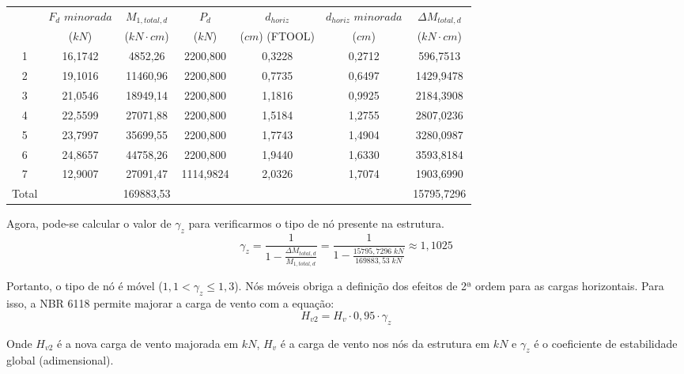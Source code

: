 \begin{table}[H]
\centering
\begin{tabular}{c|c|c|ccc|c}
\hline
 & $F_d$ $minorada$ & $M_{1, total, d}$ & \multicolumn{1}{c|}{$P_d$} & \multicolumn{1}{c|}{$d_{horiz}$} & $d_{horiz}$ $minorada$ & $\Delta M_{total, d}$ \\
 & ($kN$) & ($kN\cdot cm$) & \multicolumn{1}{c|}{($kN$)} & \multicolumn{1}{c|}{($cm$) (FTOOL)} & ($cm$) & ($kN\cdot cm$) \\ \hline
1 & 16,1742 & 4852,26 & \multicolumn{1}{c|}{2200,800} & \multicolumn{1}{c|}{0,3228} & 0,2712 & 596,7513 \\
2 & 19,1016 & 11460,96 & \multicolumn{1}{c|}{2200,800} & \multicolumn{1}{c|}{0,7735} & 0,6497 & 1429,9478 \\
3 & 21,0546 & 18949,14 & \multicolumn{1}{c|}{2200,800} & \multicolumn{1}{c|}{1,1816} & 0,9925 & 2184,3908 \\
4 & 22,5599 & 27071,88 & \multicolumn{1}{c|}{2200,800} & \multicolumn{1}{c|}{1,5184} & 1,2755 & 2807,0236 \\
5 & 23,7997 & 35699,55 & \multicolumn{1}{c|}{2200,800} & \multicolumn{1}{c|}{1,7743} & 1,4904 & 3280,0987 \\
6 & 24,8657 & 44758,26 & \multicolumn{1}{c|}{2200,800} & \multicolumn{1}{c|}{1,9440} & 1,6330 & 3593,8184 \\
7 & 12,9007 & 27091,47 & \multicolumn{1}{c|}{1114,9824} & \multicolumn{1}{c|}{2,0326} & 1,7074 & 1903,6990 \\ \hline
Total &  & 169883,53 &  &  &  & 15795,7296 \\ \cline{1-1} \cline{3-3} \cline{7-7} 
\end{tabular}
\end{table}

Agora, pode-se calcular o valor de $\gamma_z$ para verificarmos o tipo de nó presente na estrutura.
$$\gamma_z=\frac{1}{1-\frac{\Delta M_{total, d}}{M_{1, total, d}}}=\frac{1}{1-\frac{15795,7296\;kN}{169883,53\;kN}}\approx1,1025$$

Portanto, o tipo de nó é móvel ($1,1<\gamma_z\leqslant1,3$). Nós móveis obriga a definição dos efeitos de 2ª ordem para as cargas horizontais. Para isso, a NBR 6118 permite majorar a carga de vento com a equação:
$$H_{v2}=H_v\cdot0,95\cdot\gamma_z$$

Onde $H_{v2}$ é a nova carga de vento majorada em $kN$, $H_v$ é a carga de vento nos nós da estrutura em $kN$ e $\gamma_z$ é o coeficiente de estabilidade global (adimensional).

